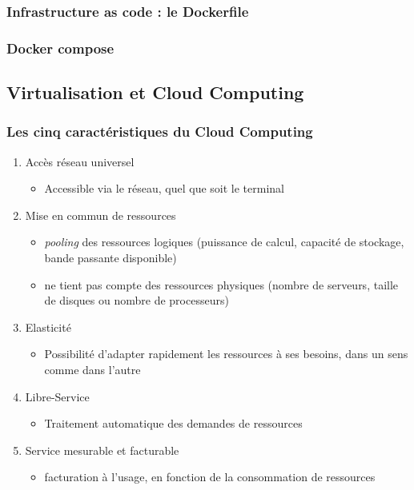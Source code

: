\begin{frame}
\frametitle{Infrastructure as code : le Dockerfile}


\end{frame}

\begin{frame}
\frametitle{Docker compose}

\end{frame}

\subsection{Virtualisation et Cloud Computing}

\begin{frame}
\frametitle{Les cinq caractéristiques du Cloud Computing \cite{intro-cloud}}
\begin{enumerate}
\item <1>Accès réseau universel
\begin{itemize}
\item Accessible via le réseau, quel que soit le terminal
\end{itemize}
\item <2>Mise en commun de ressources
\begin{itemize}
\item \textit{pooling} des ressources logiques (puissance de calcul, capacité de stockage, bande passante disponible)
\item ne tient pas compte des ressources physiques (nombre de serveurs, taille de disques ou nombre de processeurs)
\end{itemize}
\item <3>Elasticité
\begin{itemize}
\item Possibilité d'adapter rapidement les ressources à ses besoins, dans un sens comme dans l'autre
\end{itemize}
\item <4>Libre-Service
\begin{itemize}
\item Traitement automatique des demandes de ressources
\end{itemize}
\item <5>Service mesurable et facturable
\begin{itemize}
\item facturation à l'usage, en fonction de la consommation de ressources
\end{itemize}
\end{enumerate}
\end{frame}

